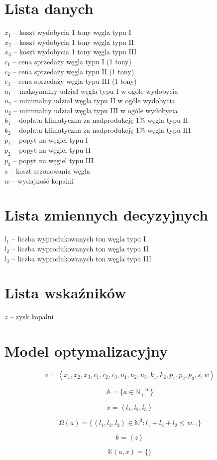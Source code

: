\documentclass[titlepage]{article}
\begin{document}
\section{Lista danych}
$x_1$ -- koszt wydobycia 1 tony węgla typu I \\
$x_2$ -- koszt wydobycia 1 tony węgla typu II \\
$x_3$ -- koszt wydobycia 1 tony węgla typu III \\
$c_1$ -- cena sprzedaży węgla typu I (1 tony) \\
$c_2$ -- cena sprzedaży węgla typu II (1 tony) \\
$c_3$ -- cena sprzedaży węgla typu III (1 tony) \\
$u_1$ -- maksymalny udział węgla typu I w ogóle wydobycia \\
$u_2$ -- minimalny udział węgla typu II w ogóle wydobycia \\
$u_2$ -- minimalny udział węgla typu III w ogóle wydobycia \\
$k_1$ -- dopłata klimatyczna za nadprodukcję 1\% węgla typu II \\
$k_2$ -- dopłata klimatyczna za nadprodukcję 1\% węgla typu III \\
$p_1$ -- popyt na węgiel typu I \\
$p_2$ -- popyt na węgiel typu II \\
$p_3$ -- popyt na węgiel typu III \\
$s$ -- koszt sezonowania węgla \\
$w$ -- wydajność kopalni \\

\section{Lista zmiennych decyzyjnych}
$l_1$ -- liczba wyprodukowanych ton węgla typu I \\
$l_2$ -- liczba wyprodukowanych ton węgla typu II \\
$l_3$ -- liczba wyprodukowanych ton węgla typu III \\

\section{Lista wskaźników}
$z$ -- zysk kopalni \\

\section{Model optymalizacyjny}
$$a = \left< x_1, x_2, x_3, c_1, c_2, c_3, u_1, u_2, u_3, k_1, k_2, p_1, p_2, p_3, s, w \right>$$

$$\mathbb{A} = \{ a \in \mathbb{N_+}^{16} \}$$

$$x = \left< l_1, l_2, l_3 \right>$$

$$\Omega(a) = \{ \left< l_1, l_2, l_3 \right> \in \mathbb{N}^3: l_1 + l_2 + l_2 \leq w \ldots \}$$

$$k = \left< z \right>$$

$$\mathbb{K}(a, x) = \{ \}$$
\end{document}
